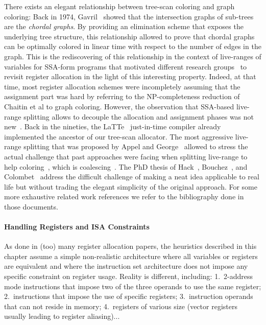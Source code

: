 {There exists an elegant relationship between tree-scan coloring and graph coloring:
Back in 1974, Gavril~\cite{Gavril:1974:JCS} showed that the intersection graphs of sub-trees are the \emph{chordal graphs}.
By providing an elimination scheme that exposes the underlying tree structure, this relationship allowed to prove that chordal graphs can be optimally colored in linear time with respect to the number of edges in the graph.
This is the rediscovering of this relationship in the context of live-ranges of variables for SSA-form programs that motivated different research groups~\cite{HGG:2005:RegisterSSA,brisk:2005:poly,pereira:2005:chordal,Bouchez06} to revisit register allocation in the light of this interesting property.
Indeed, at that time, most register allocation schemes were incompletely assuming that the assignment part was hard by referring to the NP-completeness reduction of Chaitin et al to graph coloring.
However, the observation that SSA-based live-range splitting allows to decouple the allocation and assignment phases was not new~\cite{CyFe87,Fabr79}.
Back in the nineties, the LaTTe~\cite{yang1999latte} just-in-time compiler already implemented the ancestor of our tree-scan allocator.
The most aggressive live-range splitting that was proposed by Appel and George~\cite{Appel01} allowed to stress the actual challenge that past approaches were facing when splitting live-range to help coloring~\cite{cooper1998live}, which is coalescing~\cite{BouchezDR07:coalescing-cplx}.
The PhD thesis of Hack~\cite{Hack07a}, Bouchez~\cite{bouchez-phd}, and Colombet~\cite{colombet-phd} address the difficult challenge of making a neat idea applicable to real life but without trading the elegant simplicity of the original approach.
For some more exhaustive related work references we refer to the bibliography done in those documents. 

\paragraph{Handling Registers and ISA Constraints}
As done in (too) many register allocation papers, the heuristics described in this chapter assume a simple non-realistic architecture where all variables or registers are equivalent and where the instruction set architecture does not impose any specific constraint on register usage. 
Reality is different, including:
1.~2-address mode instructions that impose two of the three operands to use the same register;
2.~instructions that impose the use of specific registers;
3.~instruction operands that can not reside in memory;
4.~registers of various size (vector registers usually leading to register aliasing)...

}
